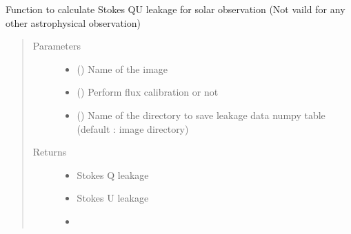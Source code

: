 \documentclass[letterpaper,10pt,english]{sphinxmanual}
\begin{document}
\begin{fulllineitems}
\begin{fulllineitems}
\label{\detokenize{paircars:paircars.fullpol_selfcal_LTS.PolSelfcal.cal_solar_qu_leakage}}
\sphinxAtStartPar
Function to calculate Stokes QU leakage for solar observation (Not vaild for any other astrophysical observation)
\begin{quote}\begin{description}
\item[{Parameters}] \leavevmode\begin{itemize}
\item {} 
\sphinxAtStartPar
{} () \textendash{} Name of the image

\item {} 
\sphinxAtStartPar
{} () \textendash{} Perform flux calibration or not

\item {} 
\sphinxAtStartPar
{} () \textendash{} Name of the directory to save leakage data numpy table (default : image directory)

\end{itemize}

\item[{Returns}] \leavevmode
\sphinxAtStartPar
\begin{itemize}
\item {} 
\sphinxAtStartPar
{} \textendash{} Stokes Q leakage

\item {} 
\sphinxAtStartPar
{} \textendash{} Stokes U leakage

\item {} 
\sphinxAtStartPar
{}

\end{itemize}


\end{description}\end{quote}

\end{fulllineitems}


\end{fulllineitems}
\end{document}
